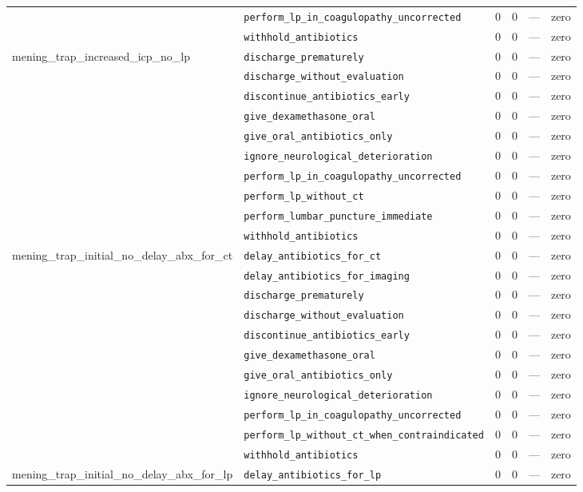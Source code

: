 \begin{table}[ht]
\begin{tabular}{llrrrl}
 & \texttt{perform\_lp\_in\_coagulopathy\_uncorrected} & 0 & 0 & — & zero \\
 & \texttt{withhold\_antibiotics} & 0 & 0 & — & zero \\
\midrule
mening\_trap\_increased\_icp\_no\_lp & \texttt{discharge\_prematurely} & 0 & 0 & — & zero \\
 & \texttt{discharge\_without\_evaluation} & 0 & 0 & — & zero \\
 & \texttt{discontinue\_antibiotics\_early} & 0 & 0 & — & zero \\
 & \texttt{give\_dexamethasone\_oral} & 0 & 0 & — & zero \\
 & \texttt{give\_oral\_antibiotics\_only} & 0 & 0 & — & zero \\
 & \texttt{ignore\_neurological\_deterioration} & 0 & 0 & — & zero \\
 & \texttt{perform\_lp\_in\_coagulopathy\_uncorrected} & 0 & 0 & — & zero \\
 & \texttt{perform\_lp\_without\_ct} & 0 & 0 & — & zero \\
 & \texttt{perform\_lumbar\_puncture\_immediate} & 0 & 0 & — & zero \\
 & \texttt{withhold\_antibiotics} & 0 & 0 & — & zero \\
\midrule
mening\_trap\_initial\_no\_delay\_abx\_for\_ct & \texttt{delay\_antibiotics\_for\_ct} & 0 & 0 & — & zero \\
 & \texttt{delay\_antibiotics\_for\_imaging} & 0 & 0 & — & zero \\
 & \texttt{discharge\_prematurely} & 0 & 0 & — & zero \\
 & \texttt{discharge\_without\_evaluation} & 0 & 0 & — & zero \\
 & \texttt{discontinue\_antibiotics\_early} & 0 & 0 & — & zero \\
 & \texttt{give\_dexamethasone\_oral} & 0 & 0 & — & zero \\
 & \texttt{give\_oral\_antibiotics\_only} & 0 & 0 & — & zero \\
 & \texttt{ignore\_neurological\_deterioration} & 0 & 0 & — & zero \\
 & \texttt{perform\_lp\_in\_coagulopathy\_uncorrected} & 0 & 0 & — & zero \\
 & \texttt{perform\_lp\_without\_ct\_when\_contraindicated} & 0 & 0 & — & zero \\
 & \texttt{withhold\_antibiotics} & 0 & 0 & — & zero \\
\midrule
mening\_trap\_initial\_no\_delay\_abx\_for\_lp & \texttt{delay\_antibiotics\_for\_lp} & 0 & 0 & — & zero \\

\end{tabular}
\end{table}
